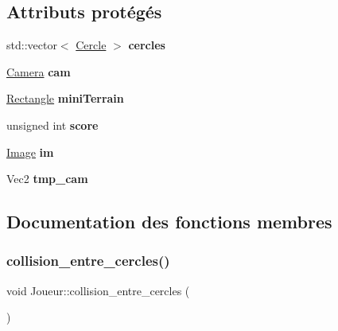 \subsection*{Attributs protégés}
\begin{DoxyCompactItemize}
\item 
\mbox{\label{class_joueur_a02b2f6b94369cc76a1dabe2aa2e03859}} 
std\+::vector$<$ \mbox{\hyperlink{class_cercle}{Cercle}} $>$ {\bfseries cercles}
\item 
\mbox{\label{class_joueur_a4644f792cd654951b6f0b39132deb138}} 
\mbox{\hyperlink{class_camera}{Camera}} {\bfseries cam}
\item 
\mbox{\label{class_joueur_aad7f2cb36e267b5493c42e04e63f7364}} 
\mbox{\hyperlink{class_rectangle}{Rectangle}} {\bfseries mini\+Terrain}
\item 
\mbox{\label{class_joueur_acaf76cda88d77ec17a00c36bd4783c45}} 
unsigned int {\bfseries score}
\item 
\mbox{\label{class_joueur_ad7e0c8c70d60d8094006a37fa13d32aa}} 
\mbox{\hyperlink{class_image}{Image}} {\bfseries im}
\item 
\mbox{\label{class_joueur_ac1d96120c39a07fd4b8c15a8423aaf11}} 
Vec2 {\bfseries tmp\+\_\+cam}
\end{DoxyCompactItemize}


\subsection{Documentation des fonctions membres}
\mbox{\label{class_joueur_ab37bf9dea93f89ed59a8103aa9a4ec00}} 
\subsubsection{\texorpdfstring{collision\+\_\+entre\+\_\+cercles()}{collision\_entre\_cercles()}}
{\footnotesize\ttfamily void Joueur\+::collision\+\_\+entre\+\_\+cercles (\begin{DoxyParamCaption}{ }\end{DoxyParamCaption})}



